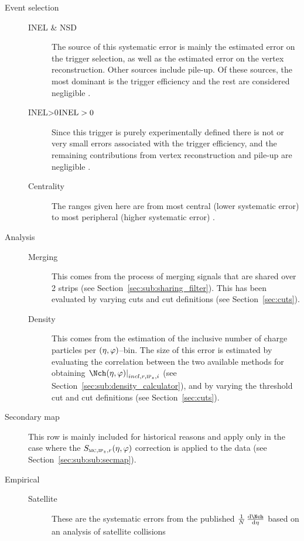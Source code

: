 \documentclass[compat,11pt]{alicenote}
\DeclareRobustCommand{\AlwaysText}[1]{\ifmmode\relax\text{#1}\else #1\fi}
\newcommand*\INEL{\AlwaysText{INEL}}
\newcommand*\NSD{\AlwaysText{NSD}}
\newcommand*\INELGT{\ifmmode\INEL>0\else$\INEL>0$\fi}
\newcommand*{\etaphi}{\ensuremath(\eta,\varphi)}
\newcommand*\SecMap{\ensuremath S_{\subMC,\subIPz,r}\etaphi}
\newcommand{\secref}[1]{Section~\ref{#1}}
\newcommand{\dndetadphi}[1][]{{\ensuremath%
    \ifx|#1|\else\left.\fi%
      \Nch\etaphi%
      \ifx|#1|\else\right|_{#1}\fi}}
\begin{document}
\begin{description}
\item[Event selection] \hbox{}\hfill
  \begin{description}
  \item[\INEL{} \& \NSD{}] The source of this systematic error is
    mainly the estimated error on the trigger selection, as well as
    the estimated error on the vertex reconstruction.  Other sources
    include pile-up.  Of these sources, the most dominant is the
    trigger efficiency and the rest are considered negligible
    \cite{pwgud:2015}.
  \item[\INELGT{}] Since this trigger is purely experimentally defined
    there is not or very small errors associated with the trigger
    efficiency, and the remaining contributions from vertex
    reconstruction and pile-up are negligible \cite{pwgud:2015}.
  \item[Centrality] The ranges given here are from most central (lower
    systematic error) to most peripheral (higher systematic error)
    \cite{Adam:2014qja,PbPbCent:XXX}.
  \end{description}
\item[Analysis] \hbox{}\hfill
  \begin{description}
  \item[Merging] This comes from the process of merging signals that
    are shared over 2 strips (see \secref{sec:sub:sharing_filter}).
    This has been evaluated by varying cuts and cut definitions (see
    \secref{sec:cuts}).
  \item[Density] This comes from the estimation of the inclusive
    number of charge particles per $\etaphi$--bin.  The size of this
    error is estimated by evaluating the correlation between the two
    available methods for obtaining $\dndetadphi[incl,r,\subIPz,i]$
    (see \secref{sec:sub:density_calculator}), and by varying the
    threshold cut and cut definitions (see \secref{sec:cuts}). 
  \end{description}
\item[Secondary map] This row is mainly included for historical
  reasons and apply only in the case where the $\SecMap$ correction is
  applied to the data (see \secref{sec:sub:sub:secmap}). 
\item[Empirical] \hbox{}\hfill 
  \begin{description}
  \item[Satellite] These are the systematic errors from the published
    $\ndndeta$ based on an analysis of satellite collisions

\end{description}
\end{description}
\end{document}
